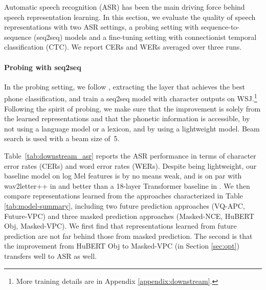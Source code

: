 \documentclass[11pt,a4paper]{article}
\begin{document}
Automatic speech recognition (ASR) has been the main driving force behind speech representation 
learning. In this section, we evaluate the quality of speech representations with two ASR settings, a probing setting with sequence-to-sequence (seq2seq) models and a fine-tuning setting with connectionist temporal classification (CTC).
We report CERs and WERs averaged over three runs. 

\paragraph{Probing with seq2seq}

In the probing setting, we follow \citet{yang2022autoregressive}, extracting the layer that achieves the best phone classification, and train a seq2seq model with character outputs on WSJ.\footnote{
More training details are in Appendix \ref{appendix:downstream}.}
Following the spirit of probing, we make sure that the improvement is solely from the learned representations 
and that the phonetic information is accessible, by not using a language model or a lexicon,
and by using a lightweight model.
Beam search is used with a beam size of~5.

Table~\ref{tab:downstream_asr} reports the ASR performance in terms of character error rates (CERs) and word error rates (WERs).
Despite being lightweight, our baseline model on log Mel features is by no means weak, and is on par with wav2letter++ in \citet{8683535} and 
better than a 18-layer Transformer baseline in \citet{higuchi2020mask}.
We then compare representations learned from the approaches characterized in Table \ref{tab:model-summary}, including two future prediction approaches (VQ-APC, Future-VPC) and three masked prediction approaches (Masked-NCE, HuBERT Obj, Masked-VPC).
We first find that representations learned from future prediction are not far behind those from masked prediction.
The second is that the improvement from HuBERT Obj to Masked-VPC (in Section \ref{sec:opt}) transfers well to ASR as well.
\end{document}
